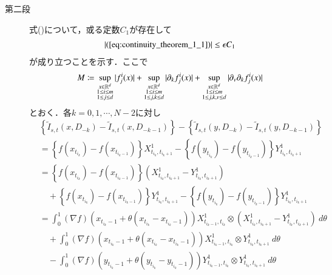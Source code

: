 \begin{prf}
\begin{description}
			\item[第二段]
				式()について，或る定数$C_1$が存在して
				\begin{align}
					|(\refeq{eq:continuity_theorem_1_1})| \leq \epsilon C_1
					\label{eq:continuity_theorem_1_3}
				\end{align}
				が成り立つことを示す．ここで
				\begin{align}
					M \coloneqq
						\operatorname*{sup}_{\substack{x \in \mathbb{R}^d \\ 1 \leq i \leq m \\ 1 \leq j \leq d}} |f^i_j(x)| 
						+ \operatorname*{sup}_{\substack{x \in \mathbb{R}^d \\ 1 \leq i \leq m \\ 1 \leq j,k \leq d}} |\partial_k f^i_j(x)|
						+ \operatorname*{sup}_{\substack{x \in \mathbb{R}^d \\ 1 \leq i \leq m \\ 1 \leq j,k,v \leq d}} |\partial_v \partial_k f^i_j(x)|
					\label{eq:continuity_theorem_1_4}
				\end{align}
				とおく．各$k = 0,1,\cdots,N-2$に対し
				\begin{align}
					&\left\{ \tilde{I}_{s,t}(x,D_{-k}) - \tilde{I}_{s,t}(x,D_{-k-1}) \right\} - 
						\left\{ \tilde{I}_{s,t}(y,D_{-k}) - \tilde{I}_{s,t}(y,D_{-k-1}) \right\} \\
					&=	\left\{ f(x_{t_{i_k}}) - f(x_{t_{i_k-1}}) \right\} X^1_{t_{i_k},t_{i_k+1}}
						- \left\{ f(y_{t_{i_k}}) - f(y_{t_{i_k-1}}) \right\} Y^1_{t_{i_k},t_{i_k+1}} \\
					&= \left\{ f(x_{t_{i_k}}) - f(x_{t_{i_k-1}}) \right\} \left( X^1_{t_{i_k},t_{i_k+1}} - Y^1_{t_{i_k},t_{i_k+1}} \right) \\
						&\quad +\left\{ f(x_{t_{i_k}}) - f(x_{t_{i_k-1}}) \right\} Y^1_{t_{i_k},t_{i_k+1}} - \left\{ f(y_{t_{i_k}}) - f(y_{t_{i_k-1}}) \right\} Y^1_{t_{i_k},t_{i_k+1}} \\
					&= \int_0^1 (\nabla f)( x_{t_{i_k}-1}+\theta ( x_{t_{i_k}}-x_{t_{i_k}-1} ))
						X^1_{t_{i_k-1},t_{i_k}} \otimes \left( X^1_{t_{i_k},t_{i_k+1}} - Y^1_{t_{i_k},t_{i_k+1}} \right)\ d\theta \\
						&\quad + \int_0^1 (\nabla f)( x_{t_{i_k}-1}+\theta ( x_{t_{i_k}}-x_{t_{i_k}-1} ))
						X^1_{t_{i_k-1},t_{i_k}} \otimes Y^1_{t_{i_k},t_{i_k+1}}\ d\theta \\
						&\quad - \int_0^1 (\nabla f)( y_{t_{i_k}-1}+\theta ( y_{t_{i_k}}-y_{t_{i_k}-1} ))
						Y^1_{t_{i_k-1},t_{i_k}} \otimes Y^1_{t_{i_k},t_{i_k+1}}\ d\theta \\

\end{align}
\end{description}
\end{prf}
